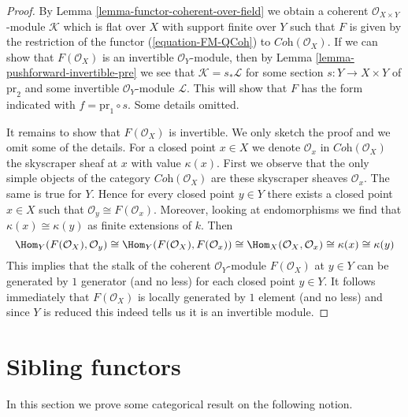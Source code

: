 \begin{proof}
By Lemma \ref{lemma-functor-coherent-over-field} we obtain a coherent
$\mathcal{O}_{X \times Y}$-module $\mathcal{K}$ which is flat
over $X$ with support finite over $Y$ such that $F$ is given by
the restriction of the functor
(\ref{equation-FM-QCoh}) to $\textit{Coh}(\mathcal{O}_X)$.
If we can show that $F(\mathcal{O}_X)$ is an invertible $\mathcal{O}_Y$-module,
then by Lemma \ref{lemma-pushforward-invertible-pre}
we see that $\mathcal{K} = s_*\mathcal{L}$
for some section $s : Y \to X \times Y$ of $\text{pr}_2$ and some
invertible $\mathcal{O}_Y$-module $\mathcal{L}$.
This will show that $F$ has the form indicated with
$f = \text{pr}_1 \circ s$. Some details omitted.

\medskip\noindent
It remains to show that $F(\mathcal{O}_X)$ is invertible. We only
sketch the proof and we omit some of the details.
For a closed point $x \in X$ we denote
$\mathcal{O}_x$ in $\textit{Coh}(\mathcal{O}_X)$
the skyscraper sheaf at $x$ with value $\kappa(x)$.
First we observe that the only simple objects
of the category $\textit{Coh}(\mathcal{O}_X)$
are these skyscraper sheaves $\mathcal{O}_x$.
The same is true for $Y$. Hence for every closed point $y \in Y$
there exists a closed point $x \in X$ such that
$\mathcal{O}_y \cong F(\mathcal{O}_x)$. Moreover, looking at endomorphisms
we find that $\kappa(x) \cong \kappa(y)$ as finite extensions of $k$.
Then
$$
\Hom_Y(F(\mathcal{O}_X), \mathcal{O}_y) \cong
\Hom_Y(F(\mathcal{O}_X), F(\mathcal{O}_x)) \cong
\Hom_X(\mathcal{O}_X, \mathcal{O}_x) \cong \kappa(x) \cong \kappa(y)
$$
This implies that the stalk of the coherent $\mathcal{O}_Y$-module
$F(\mathcal{O}_X)$ at $y \in Y$ can be generated by $1$ generator
(and no less) for each closed point $y \in Y$. It follows immediately
that $F(\mathcal{O}_X)$ is locally generated by $1$ element (and no less)
and since $Y$ is reduced this indeed tells us it is an invertible module.
\end{proof}





\section{Sibling functors}
\label{section-sibling}

\noindent
In this section we prove some categorical result on the following notion.

